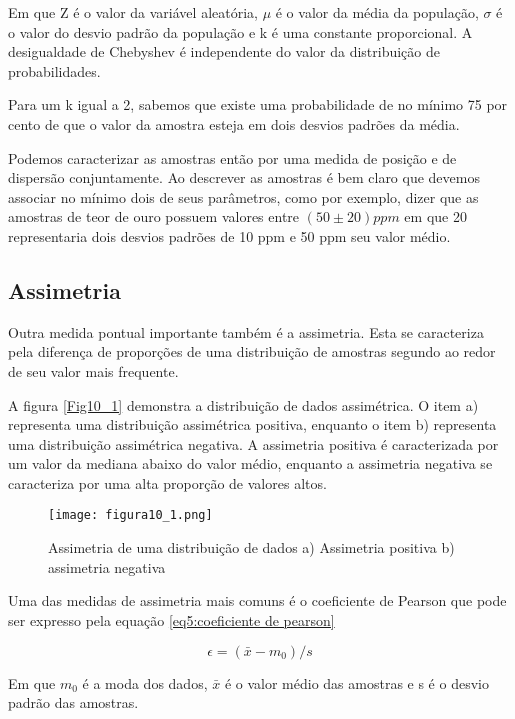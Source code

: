 Em que Z é o valor da variável aleatória, $\mu$ é o valor da média da população, $\sigma$ é o valor do desvio padrão da população e k é uma constante proporcional. A desigualdade de Chebyshev é independente do valor da distribuição de probabilidades.

 Para um k igual a 2, sabemos que existe uma probabilidade de no mínimo 75 por cento de que o valor da amostra esteja em dois desvios padrões da média.

Podemos caracterizar as amostras então por uma medida de posição e de dispersão conjuntamente. Ao descrever as amostras é bem claro que devemos associar no mínimo dois de seus parâmetros, como por exemplo, dizer que as amostras de teor de ouro possuem valores entre $\left(50 \pm 20 \right) ppm$ em que 20 representaria dois desvios padrões de 10 ppm e 50 ppm seu valor médio.

\subsection{Assimetria}

Outra medida pontual importante também é a assimetria. Esta se caracteriza pela diferença de proporções de uma distribuição de amostras segundo ao redor de seu valor mais frequente. 

A figura \eqref{Fig10_1} demonstra a distribuição de dados assimétrica. O item a) representa uma distribuição assimétrica positiva, enquanto o item b) representa uma distribuição assimétrica negativa. A assimetria positiva é caracterizada por um valor da mediana abaixo do valor médio, enquanto a assimetria negativa se caracteriza por uma alta proporção de valores altos. 


\begin{figure}[H]
 	\centering
 	\texttt{[image: figura10\_1.png]}	
 	\caption{Assimetria de uma distribuição de dados a) Assimetria positiva b) assimetria negativa }
 	\label{Fig10_1}
\end{figure}

Uma das medidas de assimetria mais comuns é o coeficiente de Pearson que pode ser expresso pela equação \eqref{eq5:coeficiente de pearson}


\begin{equation}\label{eq5:coeficiente de pearson}
\epsilon = \left( \bar{x} - m_0\right)/s
\end{equation}


Em que $m_0$ é a moda dos dados, $\bar{x}$ é o valor médio das amostras e s é o desvio padrão das amostras. 

